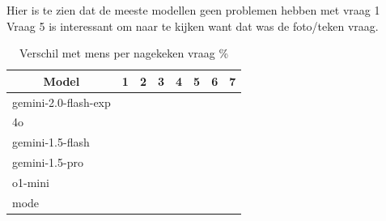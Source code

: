 \documentclass[12pt]{article}
\begin{document}
\noindent\begin{table}[H]
\caption{Verschil met mens per nagekeken vraag \%}
\label{fig:verschil-mens}
Hier is te zien dat de meeste modellen geen problemen hebben met vraag 1\\
Vraag 5 is interessant om naar te kijken want dat was de foto/teken vraag.
\begin{tabularx}{\textwidth}{X rrrrrrr}
    \toprule
    \multicolumn{1}{c}{\textbf{Model}} & \multicolumn{1}{c}{\textbf{1}} & \multicolumn{1}{c}{\textbf{2}} & \multicolumn{1}{c}{\textbf{3}} & \multicolumn{1}{c}{\textbf{4}} & \multicolumn{1}{c}{\textbf{5}} & \multicolumn{1}{c}{\textbf{6}} & \multicolumn{1}{c}{\textbf{7}} \\
    \midrule
    gemini-2.0-flash-exp & \cellcolor[rgb]{0.275,0.514,0.275}{0.00} & \cellcolor[rgb]{0.442,0.626,0.442}{4.44} & \cellcolor[rgb]{0.881,0.921,0.881}{16.09} & \cellcolor[rgb]{0.543,0.693,0.543}{7.11} & \cellcolor[rgb]{0.543,0.694,0.543}{7.12} & \cellcolor[rgb]{0.450,0.631,0.450}{4.65} & \cellcolor[rgb]{0.639,0.758,0.639}{9.67}  \\
    4o & \cellcolor[rgb]{0.439,0.624,0.439}{4.35} & \cellcolor[rgb]{0.360,0.571,0.360}{2.27} & \cellcolor[rgb]{0.510,0.671,0.510}{6.23} & \cellcolor[rgb]{0.683,0.787,0.683}{10.82} & \cellcolor[rgb]{0.458,0.637,0.458}{4.87} & \cellcolor[rgb]{0.608,0.737,0.608}{8.83} & \cellcolor[rgb]{0.717,0.810,0.717}{11.74} \\
    gemini-1.5-flash & \cellcolor[rgb]{0.439,0.624,0.439}{4.35} & \cellcolor[rgb]{0.275,0.514,0.275}{0.00} & \cellcolor[rgb]{0.772,0.847,0.772}{13.19} & \cellcolor[rgb]{0.880,0.920,0.880}{16.06} & \cellcolor[rgb]{0.623,0.747,0.623}{9.23} & \cellcolor[rgb]{0.450,0.631,0.450}{4.65} & \cellcolor[rgb]{0.975,0.983,0.975}{18.56}\\
    gemini-1.5-pro & \cellcolor[rgb]{0.439,0.624,0.439}{4.35} & \cellcolor[rgb]{0.360,0.571,0.360}{2.27} & \cellcolor[rgb]{0.931,0.953,0.931}{17.39} & \cellcolor[rgb]{0.767,0.844,0.767}{13.05} & \cellcolor[rgb]{0.623,0.747,0.623}{9.23} & \cellcolor[rgb]{0.608,0.737,0.608}{8.83} & \cellcolor[rgb]{0.918,0.945,0.918}{17.07}\\
    o1-mini & \cellcolor[rgb]{0.275,0.514,0.275}{0.00} & \cellcolor[rgb]{0.903,0.935,0.903}{16.65} & \cellcolor[rgb]{0.829,0.885,0.829}{14.69} & \cellcolor[rgb]{0.387,0.589,0.387}{2.98} & \cellcolor[rgb]{1.000,1.000,1.000}{19.23} & \cellcolor[rgb]{0.450,0.631,0.450}{4.65} & \cellcolor[rgb]{0.556,0.703,0.556}{7.47} \\
    mode & \cellcolor[rgb]{0.439,0.624,0.439}{4.35} & \cellcolor[rgb]{0.275,0.514,0.275}{0.00} & \cellcolor[rgb]{0.435,0.621,0.435}{4.25} & \cellcolor[rgb]{0.683,0.787,0.683}{10.82} & \cellcolor[rgb]{0.623,0.747,0.623}{9.23} & \cellcolor[rgb]{0.531,0.686,0.531}{6.79} & \cellcolor[rgb]{0.790,0.859,0.790}{13.66} \\
    \bottomrule
\end{tabularx}
\end{table}
\end{document}

